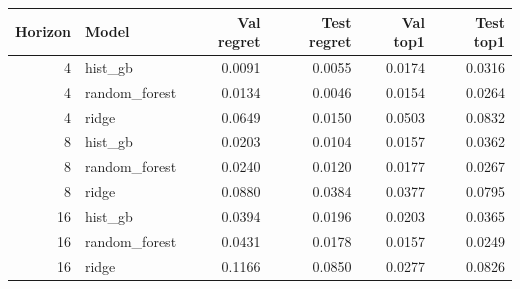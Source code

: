 \begin{tabular}{r l r r r r}
\toprule
Horizon & Model & Val regret & Test regret & Val top1 & Test top1 \\
\midrule
4 & hist_gb & 0.0091 & 0.0055 & 0.0174 & 0.0316 \\
4 & random_forest & 0.0134 & 0.0046 & 0.0154 & 0.0264 \\
4 & ridge & 0.0649 & 0.0150 & 0.0503 & 0.0832 \\
8 & hist_gb & 0.0203 & 0.0104 & 0.0157 & 0.0362 \\
8 & random_forest & 0.0240 & 0.0120 & 0.0177 & 0.0267 \\
8 & ridge & 0.0880 & 0.0384 & 0.0377 & 0.0795 \\
16 & hist_gb & 0.0394 & 0.0196 & 0.0203 & 0.0365 \\
16 & random_forest & 0.0431 & 0.0178 & 0.0157 & 0.0249 \\
16 & ridge & 0.1166 & 0.0850 & 0.0277 & 0.0826 \\
\bottomrule
\end{tabular}
